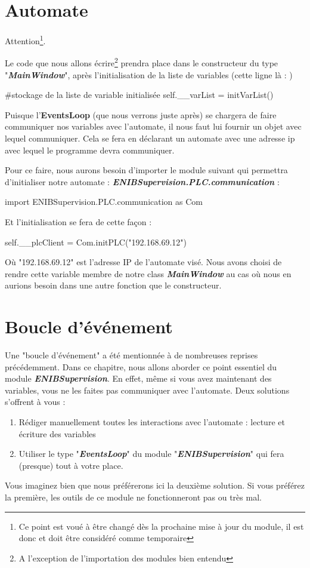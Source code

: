 \documentclass[12pt]{report}    %
\newcommand{\bold}[1]{{\bfseries #1}}
\newcommand{\ib}[1]{{\bfseries\itshape #1}}
\newcommand{\smallSkip}{\vskip 0.5cm}
\begin{document}
\section{Automate}\label{tag-plc-declaration}

Attention\footnote{
Ce point est voué à être changé dès la prochaine mise à jour du module, il est donc et doit être considéré comme temporaire}.\smallSkip

Le code que nous allons écrire\footnote{A l'exception de l'importation des modules bien entendu} prendra place dans le constructeur du type "\ib{MainWindow}", après l'initialisation de la liste de variables (cette ligne là : )
\begin{pyCode}
#stockage de la liste de variable initialisée
self.__varList = initVarList()
\end{pyCode}\smallSkip

Puisque l'\bold{EventsLoop} (que nous verrons juste après) se chargera de faire communiquer nos variables avec l'automate, il nous faut lui fournir un objet avec lequel communiquer.
Cela se fera en déclarant un automate avec une adresse ip avec lequel le programme devra communiquer.\smallSkip

Pour ce faire, nous aurons besoin d'importer le module suivant qui permettra d'initialiser notre automate : \ib{ENIBSupervision.PLC.communication} :
\begin{pyCode}
import ENIBSupervision.PLC.communication as Com
\end{pyCode}
Et l'initialisation se fera de cette façon :
\begin{pyCode}
self.__plcClient = Com.initPLC("192.168.69.12")
\end{pyCode}
Où "192.168.69.12" est l'adresse IP de l'automate visé. Nous avons choisi de rendre cette variable membre de notre class \ib{MainWindow} au cas où nous en aurions besoin dans une autre fonction que le constructeur.


\section{Boucle d'événement}

Une "boucle d'événement" a été mentionnée à de nombreuses reprises précédemment. Dans ce chapitre, nous allons aborder ce point essentiel du module \ib{ENIBSupervision}. En effet, même si vous avez maintenant des variables, vous ne les faites pas communiquer avec l'automate. Deux solutions s'offrent à vous :
\begin{enumerate}
\item Rédiger manuellement toutes les interactions avec l'automate : lecture et écriture des variables
\item Utiliser le type "\ib{EventsLoop}" du module "\ib{ENIBSupervision}" qui fera (presque) tout à votre place.
\end{enumerate}
Vous imaginez bien que nous préférerons ici la deuxième solution. Si vous préférez la première, les outils de ce module ne fonctionneront pas ou très mal.\smallSkip
\end{document}
